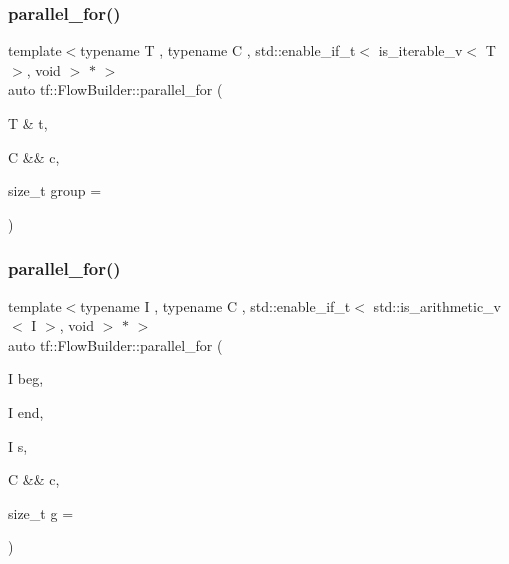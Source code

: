 \subsubsection{\texorpdfstring{parallel\+\_\+for()}{parallel\_for()}\hspace{0.1cm}{\footnotesize\ttfamily [2/3]}}
{\footnotesize\ttfamily template$<$typename T , typename C , std\+::enable\+\_\+if\+\_\+t$<$ is\+\_\+iterable\+\_\+v$<$ T $>$, void $>$ $\ast$ $>$ \\
auto tf\+::\+Flow\+Builder\+::parallel\+\_\+for (\begin{DoxyParamCaption}\item[{T \&}]{t,  }\item[{C \&\&}]{c,  }\item[{size\+\_\+t}]{group = {} }\end{DoxyParamCaption})}

\mbox{\label{classtf_1_1FlowBuilder_a54836d5d8b01e2732ad80091d9f50c18}} 
\subsubsection{\texorpdfstring{parallel\+\_\+for()}{parallel\_for()}\hspace{0.1cm}{\footnotesize\ttfamily [3/3]}}
{\footnotesize\ttfamily template$<$typename I , typename C , std\+::enable\+\_\+if\+\_\+t$<$ std\+::is\+\_\+arithmetic\+\_\+v$<$ I $>$, void $>$ $\ast$ $>$ \\
auto tf\+::\+Flow\+Builder\+::parallel\+\_\+for (\begin{DoxyParamCaption}\item[{I}]{beg,  }\item[{I}]{end,  }\item[{I}]{s,  }\item[{C \&\&}]{c,  }\item[{size\+\_\+t}]{g = {} }\end{DoxyParamCaption})}

\mbox{\label{classtf_1_1FlowBuilder_ac22f244fb2ec58809192faafa266c58c}} 
